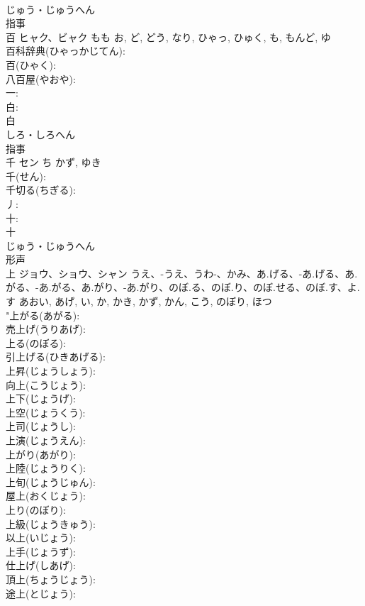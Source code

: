 \documentclass[8pt]{extreport}
\begin{document}
\begin{CJK}{UTF8}{min}
\\	じゅう・じゅうへん	
\\	指事 
\\	百	ヒャク、ビャク	もも	お, ど, どう, なり, ひゃっ, ひゅく, も, もんど, ゆ	
\\	百科辞典(ひゃっかじてん): 
\\	百(ひゃく): 
\\	八百屋(やおや): 
\\	一: 
\\	白: 
\\	白	
\\	しろ・しろへん	
\\	指事 
\\	千	セン	ち	かず, ゆき	
\\	千(せん): 
\\	千切る(ちぎる): 
\\	丿: 
\\	十: 
\\	十	
\\	じゅう・じゅうへん	
\\	形声 
\\	上	ジョウ、ショウ、シャン	うえ、-うえ、うわ-、かみ、あ.げる、-あ.げる、あ.がる、-あ.がる、あ.がり、-あ.がり、のぼ.る、のぼ.り、のぼ.せる、のぼ.す、よ.す	あおい, あげ, い, か, かき, かず, かん, こう, のぼり, ほつ	
\\	"上がる(あがる): 
\\	売上げ(うりあげ): 
\\	上る(のぼる): 
\\	引上げる(ひきあげる): 
\\	上昇(じょうしょう): 
\\	向上(こうじょう): 
\\	上下(じょうげ): 
\\	上空(じょうくう): 
\\	上司(じょうし): 
\\	上演(じょうえん): 
\\	上がり(あがり): 
\\	上陸(じょうりく): 
\\	上旬(じょうじゅん): 
\\	屋上(おくじょう): 
\\	上り(のぼり): 
\\	上級(じょうきゅう): 
\\	以上(いじょう): 
\\	上手(じょうず): 
\\	仕上げ(しあげ): 
\\	頂上(ちょうじょう): 
\\	途上(とじょう): 

\end{CJK}
\end{document}
